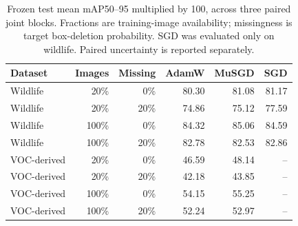 \begin{table}[ht]
\centering
\caption{Frozen test mean mAP50--95 multiplied by 100, across three paired joint blocks. Fractions are training-image availability; missingness is target box-deletion probability. SGD was evaluated only on wildlife. Paired uncertainty is reported separately.}
\begin{tabular}{lrrrrr}
\toprule
Dataset & Images & Missing & AdamW & MuSGD & SGD\\\midrule
Wildlife & 20\% & 0\% & 80.30 & 81.08 & 81.17\\
Wildlife & 20\% & 20\% & 74.86 & 75.12 & 77.59\\
Wildlife & 100\% & 0\% & 84.32 & 85.06 & 84.59\\
Wildlife & 100\% & 20\% & 82.78 & 82.53 & 82.86\\
VOC-derived & 20\% & 0\% & 46.59 & 48.14 & --\\
VOC-derived & 20\% & 20\% & 42.18 & 43.85 & --\\
VOC-derived & 100\% & 0\% & 54.15 & 55.25 & --\\
VOC-derived & 100\% & 20\% & 52.24 & 52.97 & --\\
\bottomrule
\end{tabular}
\end{table}
